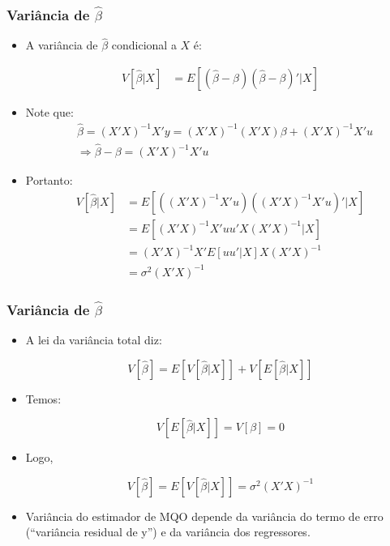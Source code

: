\documentclass[10pt,slides,xcolor=pdftex,dvipsnames,table]{beamer}
\begin{document}

\begin{frame}[fragile]
	\frametitle{Variância de $\widehat{\beta}$}

\begin{itemize}\itemsep1.2em

\item A variância de $\widehat{\beta}$ condicional a $X$ é:

\begin{align*}
V [\widehat{\beta} | X] &= E \left[ (\widehat{\beta} - \beta)(\widehat{\beta} - \beta)'| X \right] 
\end{align*}

\item Note que: 
\begin{align*}
& \widehat{\beta} = (X'X)^{-1} X'y = (X'X)^{-1} (X'X) \beta + (X'X)^{-1} X'u \\
& \Longrightarrow  \widehat{\beta} - \beta = (X'X)^{-1} X'u
\end{align*}

\item Portanto: 
\begin{align*}
V [\widehat{\beta} | X] &= E \left[ ((X'X)^{-1} X'u)((X'X)^{-1} X'u)'| X \right] \\
&= E \left[ (X'X)^{-1} X' uu' X (X'X)^{-1} | X \right] \\
&= (X'X)^{-1} X' E[u u'| X]  X (X'X)^{-1} \\
&= \sigma^2 (X'X)^{-1}
\end{align*}

\end{itemize}

\end{frame}


\begin{frame}[fragile]
	\frametitle{Variância de $\widehat{\beta}$}

\begin{itemize}\itemsep1.2em

\item A lei da variância total diz: 

$$ V [\widehat{\beta} ] = E \left[ V[\widehat{\beta} | X ] \right] + V \left[ E[\widehat{\beta} | X] \right] $$

\item Temos: 

$$V \left[ E[\widehat{\beta} | X] \right] = V [ \beta] = 0$$

\item Logo, 

$$ V [\widehat{\beta} ] = E \left[ V[\widehat{\beta} | X ] \right] = \sigma^2 (X'X)^{-1}$$

\item Variância do estimador de MQO depende da variância do termo de erro (``variância residual de y'') e da variância dos regressores.

\end{itemize}

\end{frame}
\end{document}
